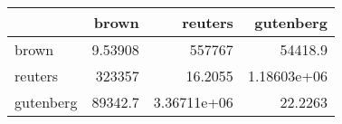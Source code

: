 \begin{tabular}{lrrr}
\hline
           &        brown &          reuters &       gutenberg \\
\hline
 brown     &      9.53908 & 557767           & 54418.9         \\
 reuters   & 323357       &     16.2055      &     1.18603e+06 \\
 gutenberg &  89342.7     &      3.36711e+06 &    22.2263      \\
\hline
\end{tabular}